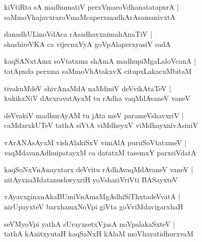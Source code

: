 \documentclass[twoside,12pt,openright]{book}
\newcounter{shloka}[chapter]
\begin{document}
\begin{shloka}%
kiVtiRta sA madhumatiV perxVmaroVdhanatatapxrA |\\
saMmoVhajavxraroVmaMcaperxmadhArAsamanivxtA 
\end{shloka}

\begin{shloka}%
danadhULinoVdAca rAsadhavxnimahAnaTiV |\\
shashireVKA ca vijecnxVyA goVpAlaperxyasiV sadA 
\end{shloka}

\begin{shloka}%
kaqSANxtAmx soVtatxma shAmA madhupiMgaLaloVcanA |\\
tatApxda perxma saMmoVhAtakxvX citupxLakacuMbitaM 
\end{shloka}

\begin{shloka}%
tivakuMdeV shivAnaMdA naMdiniV deVvikAtaTeV |\\
kukikxNiV dAvxravatAyxM tu rAdha vaqMdAvaneV vaneV 
\end{shloka}

\begin{shloka}%
deVvakiV madhurAyAM tu jAta meV parameVshavxriV |\\
caMdarxkUTeV tathA siVtA viMdheyxV viMdhayxnivAsiniV 
\end{shloka}

\begin{shloka}%
vArANAsAyxM vishAlakiSxV vimAlA puruSoVtatxmeV |\\
vaqMdavanAdhuipatayxM ca datatxM tasemxY parxsiVdatA 
\end{shloka}

\begin{shloka}%
kaqSoNxVnAnayxtarx deVvitu rAdhAvaqMdAvaneV vaneV |\\
nitAyxnaMdatanushwyxriH yoVshariVriVti BASayxteV 
\end{shloka}

\begin{shloka}%
vAyavxginxnAkaBUmiVnAmaMgAdhiSiThxtadeVvatA |\\
nirUpayxteV barxhamxNoVpi giVta goVviMdavigarxhaH
\end{shloka}

\begin{shloka}%
seVMyoVpi yathA sUrayxsetxVjasA noVpalakaSxteV |\\
tathA kAnitxyutaH kaqSaNxH kAlaM moVhayatidhurxvaM 
\end{shloka}
\end{document}
